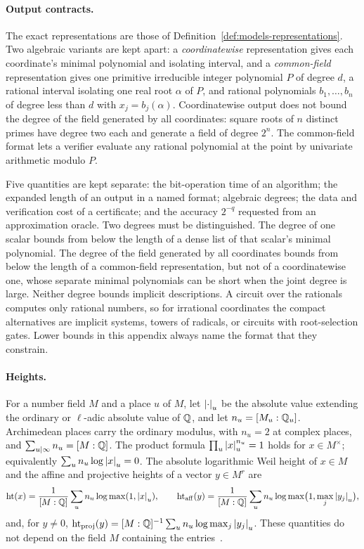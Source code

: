 \paragraph{Output contracts.}
The exact representations are those of
Definition~\ref{def:models-representations}. Two algebraic variants are kept
apart: a \emph{coordinatewise} representation gives each coordinate's
minimal polynomial and isolating interval, and a \emph{common-field}
representation gives one primitive irreducible integer polynomial $P$ of
degree $d$, a rational interval isolating one real root $\alpha$ of $P$, and
rational polynomials $b_1,\ldots,b_n$ of degree less than $d$ with
$x_j=b_j(\alpha)$. Coordinatewise output does not bound the degree of the
field generated by all coordinates: square roots of $n$ distinct primes have
degree two each and generate a field of degree $2^n$. The common-field format
lets a verifier evaluate any rational polynomial at the point by univariate
arithmetic modulo $P$.

Five quantities are kept separate: the bit-operation time of an algorithm;
the expanded length of an output in a named format; algebraic degrees; the
data and verification cost of a certificate; and the accuracy $2^{-q}$
requested from an approximation oracle. Two degrees must be distinguished.
The degree of one scalar bounds from below the length of a dense list of
that scalar's minimal polynomial. The degree of the field generated by all
coordinates bounds from below the length of a common-field representation,
but not of a coordinatewise one, whose separate minimal polynomials can be
short when the joint degree is large. Neither degree bounds implicit
descriptions. A circuit over the rationals computes only rational numbers, so
for irrational coordinates the compact alternatives are implicit systems,
towers of radicals, or circuits with root-selection gates. Lower bounds in
this appendix always name the format that they constrain.

\paragraph{Heights.}
For a number field $M$ and a place $u$ of $M$, let $\left\lvert\cdot\right\rvert_u$ be the
absolute value extending the ordinary or $\ell$-adic absolute value of $\mathbb Q$,
and let $n_u=[M_u:\mathbb Q_u]$. Archimedean places carry the ordinary modulus, with
$n_u=2$ at complex places, and $\sum_{u\mid\infty}n_u=[M:\mathbb Q]$. The product
formula $\prod_u\left\lvert x\right\rvert_u^{n_u}=1$ holds for $x\in M^\times$; equivalently
$\sum_un_u\log\left\lvert x\right\rvert_u=0$. The absolute logarithmic Weil height
of $x\in M$ and the affine and projective heights of a vector $y\in M^r$ are
\[
\operatorname{ht}(x)=\frac1{[M:\mathbb Q]}\sum_un_u\log\max(1,\left\lvert x\right\rvert_u),\qquad
\operatorname{ht}_{\rm aff}(y)=\frac1{[M:\mathbb Q]}\sum_un_u\log\max\bigl(1,\max_j\left\lvert y_j\right\rvert_u\bigr),
\]
and, for $y\ne0$,
$\operatorname{ht}_{\rm proj}(y)=[M:\mathbb Q]^{-1}\sum_un_u\log\max_j\left\lvert y_j\right\rvert_u$. These
quantities do not depend on the field $M$ containing the
entries~\cite{BombieriGubler2006}.

